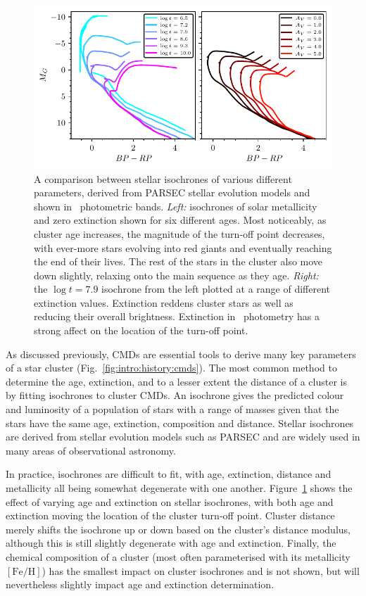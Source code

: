 \begin{figure}[tb]
	\includegraphics[width=\textwidth]{fig/c1/isochrones.pdf}
	\caption[A comparison between stellar isochrones of various different parameters.]{A comparison between stellar isochrones of various different parameters, derived from PARSEC stellar evolution models \citep{bressan_parsec_2012} and shown in \gaia\ photometric bands. \emph{Left:} isochrones of solar metallicity and zero extinction shown for six different ages. Most noticeably, as cluster age increases, the magnitude of the turn-off point decreases, with ever-more stars evolving into red giants and eventually reaching the end of their lives. The rest of the stars in the cluster also move down slightly, relaxing onto the main sequence as they age. \emph{Right:} the $\log t = 7.9$ isochrone from the left plotted at a range of different extinction values. Extinction reddens cluster stars as well as reducing their overall brightness. Extinction in \gaia\ photometry has a strong affect on the location of the turn-off point.}
	\label{fig:intro:history:isochrones}
\end{figure}

As discussed previously, CMDs are essential tools to derive many key parameters of a star cluster (Fig.~\ref{fig:intro:history:cmds}). The most common method to determine the age, extinction, and to a lesser extent the distance of a cluster is by fitting isochrones to cluster CMDs. An isochrone gives the predicted colour and luminosity of a population of stars with a range of masses given that the stars have the same age, extinction, composition and distance. Stellar isochrones are derived from stellar evolution models such as PARSEC \citep{bressan_parsec_2012} and are widely used in many areas of observational astronomy.

In practice, isochrones are difficult to fit, with age, extinction, distance and metallicity all being somewhat degenerate with one another. Figure~\ref{fig:intro:history:isochrones} shows the effect of varying age and extinction on stellar isochrones, with both age and extinction moving the location of the cluster turn-off point. Cluster distance merely shifts the isochrone up or down based on the cluster's distance modulus, although this is still slightly degenerate with age and extinction. Finally, the chemical composition of a cluster (most often parameterised with its metallicity $\left[\text{Fe}/\text{H}\right]$) has the smallest impact on cluster isochrones and is not shown, but will nevertheless slightly impact age and extinction determination.

